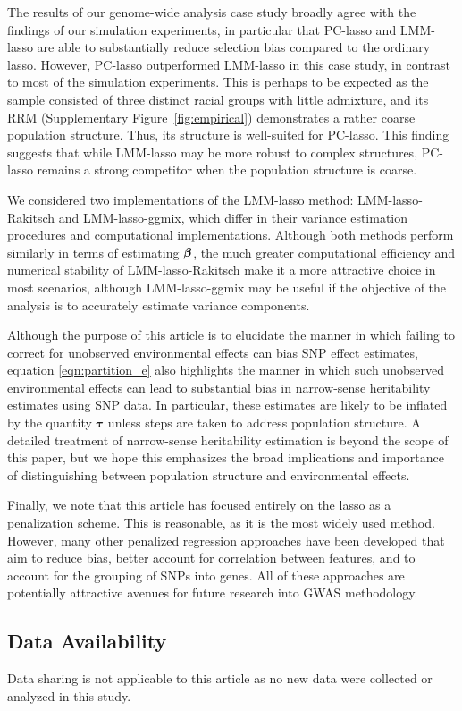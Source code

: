 The results of our genome-wide analysis case study broadly agree with the findings of our simulation experiments, in particular that PC-lasso and LMM-lasso are able to substantially reduce selection bias compared to the ordinary lasso. However, PC-lasso outperformed LMM-lasso in this case study, in contrast to most of the simulation experiments. This is perhaps to be expected as the sample consisted of three distinct racial groups with little admixture, and its RRM (Supplementary Figure~\ref{fig:empirical}) demonstrates a rather coarse population structure. Thus, its structure is well-suited for PC-lasso. This finding suggests that while LMM-lasso may be more robust to complex structures, PC-lasso remains a strong competitor when the population structure is coarse.

We considered two implementations of the LMM-lasso method: LMM-lasso-Rakitsch and LMM-lasso-ggmix, which differ in their variance estimation procedures and computational implementations. Although both methods perform similarly in terms of estimating $\boldsymbol{\beta}{}$, the much greater computational efficiency and numerical stability of LMM-lasso-Rakitsch make it a more attractive choice in most scenarios, although LMM-lasso-ggmix may be useful if the objective of the analysis is to accurately estimate variance components.

Although the purpose of this article is to elucidate the manner in which failing to correct for unobserved environmental effects can bias SNP effect estimates, equation \eqref{eqn:partition_e} also highlights the manner in which such unobserved environmental effects can lead to substantial bias in narrow-sense heritability estimates using SNP data. In particular, these estimates are likely to be inflated by the quantity $\boldsymbol{\tau}$ unless steps are taken to address population structure. A detailed treatment of narrow-sense heritability estimation is beyond the scope of this paper, but we hope this emphasizes the broad implications and importance of distinguishing between population structure and environmental effects.

Finally, we note that this article has focused entirely on the lasso as a penalization scheme. This is reasonable, as it is the most widely used method. However, many other penalized regression approaches have been developed that aim to reduce bias, better account for correlation between features, and to account for the grouping of SNPs into genes. All of these approaches are potentially attractive avenues for future research into GWAS methodology.

\subsection*{Data Availability}

Data sharing is not applicable to this article as no new data were collected or analyzed in this study.
